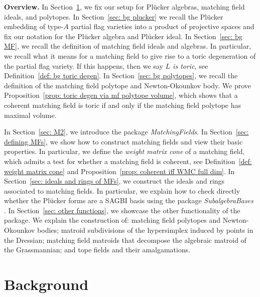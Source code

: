 \documentclass[11pt]{article}
\theoremstyle{plain}
\theoremstyle{definition}
\theoremstyle{remark}
\begin{document}
\medskip
\noindent \textbf{Overview.}
In Section~\ref{sec: background}, we fix our setup for Pl\"ucker algebras, matching field ideals, and polytopes. In Section~\ref{sec: bg plucker} we recall the Pl\"ucker embedding of type-$A$ partial flag varieties into a product of projective spaces and fix our notation for the Pl\"ucker algebra and Pl\"ucker ideal. In Section~\ref{sec: bg MF}, we recall the definition of matching field ideals and algebras. In particular, we recall what it means for a matching field to give rise to a toric degeneration of the partial flag variety. If this happens, then we say \textit{$L$ is toric}, see Definition~\ref{def: bg toric degen}. In Section~\ref{sec: bg polytopes}, we recall the definition of the matching field polytope and Newton-Okounkov body. We prove Proposition~\ref{prop: toric degen via mf polytope volume}, which shows that a coherent matching field is toric if and only if the matching field polytope has maximal volume.

In Section~\ref{sec: M2}, we introduce the package \textit{MatchingFields}.
In Section~\ref{sec: defining MFs}, we show how to construct matching fields  and view their basic properties. In particular, we define the \textit{weight matrix cone} of a matching field, which admits a test for whether a matching field is coherent, see Definition~\ref{def: weight matrix cone} and Proposition~\ref{prop: coherent iff WMC full dim}. In Section~\ref{sec: ideals and rings of MFs}, we construct the ideals and rings associated to matching fields. In particular, we explain how to check directly whether the Pl\"ucker forms are a SAGBI basis using the package \textit{SubalgebraBases} \cite{burr2023subalgebrabases}. In Section~\ref{sec: other functions}, we showcase the other functionality of the package. We explain the construction of: matching field polytopes and Newton-Okounkov bodies; matroid subdivisions of the hypersimplex induced by points in the Dressian; matching field matroids that decompose the algebraic matroid of the Grassmannian; and tope fields and their amalgamations.


\section{Background}\label{sec: background}
\end{document}
